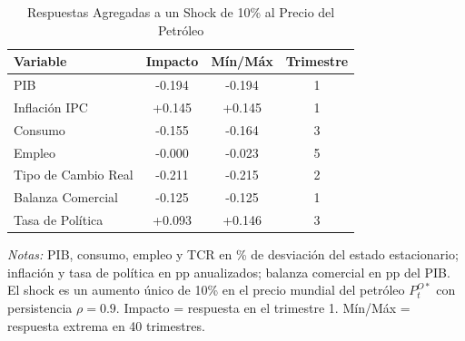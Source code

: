 \begin{table}[htbp]
\centering
\caption{Respuestas Agregadas a un Shock de 10\% al Precio del Petróleo}
\label{tab:oil_agg}
\begin{threeparttable}
\begin{tabular}{@{}l c c c@{}}
\toprule
Variable & Impacto & Mín/Máx & Trimestre \\
\midrule
PIB & -0.194 & -0.194 & 1 \\
Inflación IPC & +0.145 & +0.145 & 1 \\
Consumo & -0.155 & -0.164 & 3 \\
Empleo & -0.000 & -0.023 & 5 \\
Tipo de Cambio Real & -0.211 & -0.215 & 2 \\
Balanza Comercial & -0.125 & -0.125 & 1 \\
Tasa de Política & +0.093 & +0.146 & 3 \\
\bottomrule
\end{tabular}
\begin{tablenotes}[flushleft]
\footnotesize
\item \textit{Notas:} PIB, consumo, empleo y TCR en \% de desviación del estado estacionario; inflación y tasa de política en pp anualizados; balanza comercial en pp del PIB. El shock es un aumento único de 10\% en el precio mundial del petróleo $P^{O*}_t$ con persistencia $\rho = 0.9$. Impacto = respuesta en el trimestre 1. Mín/Máx = respuesta extrema en 40 trimestres.
\end{tablenotes}
\end{threeparttable}
\end{table}
